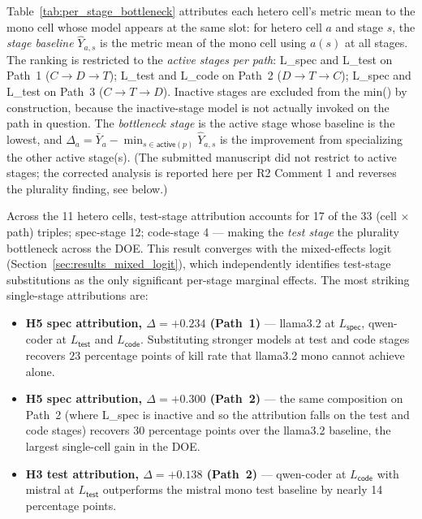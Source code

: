 

Table~\ref{tab:per_stage_bottleneck} attributes each hetero cell's metric mean to the mono cell whose model appears at the same slot: for hetero cell $a$ and stage $s$, the \emph{stage baseline} $\hat{Y}_{a,s}$ is the metric mean of the mono cell using $a(s)$ at all stages. The ranking is restricted to the \emph{active stages per path}: L\_spec and L\_test on Path~1 ($C \to D \to T$); L\_test and L\_code on Path~2 ($D \to T \to C$); L\_spec and L\_test on Path~3 ($C \to T \to D$). Inactive stages are excluded from the min() by construction, because the inactive-stage model is not actually invoked on the path in question. The \emph{bottleneck stage} is the active stage whose baseline is the lowest, and $\Delta_a = \bar{Y}_a - \min_{s \in \textsf{active}(p)} \hat{Y}_{a,s}$ is the improvement from specializing the other active stage(s). (The submitted manuscript did not restrict to active stages; the corrected analysis is reported here per R2 Comment 1 and reverses the plurality finding, see below.)

Across the 11 hetero cells, test-stage attribution accounts for 17 of the 33 (cell $\times$ path) triples; spec-stage 12; code-stage 4 --- making the \emph{test stage} the plurality bottleneck across the DOE. This result converges with the mixed-effects logit (Section~\ref{sec:results_mixed_logit}), which independently identifies test-stage substitutions as the only significant per-stage marginal effects. The most striking single-stage attributions are:

\begin{itemize}
  \item \textbf{H5 spec attribution, $\Delta = +0.234$ (Path~1)} --- llama3.2 at $L_{\textsf{spec}}$, qwen-coder at $L_{\textsf{test}}$ and $L_{\textsf{code}}$. Substituting stronger models at test and code stages recovers $23$ percentage points of kill rate that llama3.2 mono cannot achieve alone.
  \item \textbf{H5 spec attribution, $\Delta = +0.300$ (Path~2)} --- the same composition on Path~2 (where L\_spec is inactive and so the attribution falls on the test and code stages) recovers $30$ percentage points over the llama3.2 baseline, the largest single-cell gain in the DOE.
  \item \textbf{H3 test attribution, $\Delta = +0.138$ (Path~2)} --- qwen-coder at $L_{\textsf{code}}$ with mistral at $L_{\textsf{test}}$ outperforms the mistral mono test baseline by nearly 14 percentage points.
\end{itemize}

